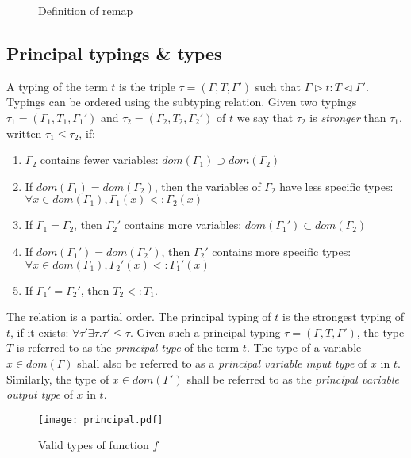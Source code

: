 \documentclass[preprint]{sigplanconf}
\newcommand{\typerule}[4]{#1 \triangleright #2 : #3 \triangleleft #4}
\begin{document}
\begin{figure}
\ottdefnremap

\caption{\label{fig:remaprules} Definition of remap}
\end{figure}

\subsection{Principal typings \& types}

A typing of the term $t$ is the triple $\tau = (\Gamma,T,\Gamma')$ such that
$\typerule{\Gamma}{t}{T}{\Gamma'}$. Typings can be ordered using the subtyping
relation. Given two typings $\tau_1 = (\Gamma_1,T_1,\Gamma_1')$ and
$\tau_2 = (\Gamma_2,T_2,\Gamma_2')$ of $t$ we say that $\tau_2$ is 
{\it stronger} than $\tau_1$, written $\tau_1 \leq \tau_2$, if:

\begin{enumerate}
\item $\Gamma_2$ contains fewer variables: 
      $dom(\Gamma_1) \supset dom(\Gamma_2)$
\item If $dom(\Gamma_1) = dom(\Gamma_2)$, 
	  then the variables of $\Gamma_2$ have less specific types: \\
      $\forall x \in dom(\Gamma_1), \Gamma_1(x) <: \Gamma_2(x)$
\item If $\Gamma_1 = \Gamma_2$, then $\Gamma_2'$ contains more variables:
      $dom(\Gamma_1') \subset dom(\Gamma_2)$
\item If $dom(\Gamma_1') = dom(\Gamma_2')$, then $\Gamma_2'$ contains
      more specific types: \\
      $\forall x \in dom(\Gamma_1), \Gamma_2'(x) <: \Gamma_1'(x)$
\item If $\Gamma_1' = \Gamma_2'$, then $T_2 <: T_1$.
\end{enumerate}

The relation is a partial order. The principal typing of $t$ is the strongest 
typing of $t$, if it exists: $\forall \tau' \exists \tau . \tau' \leq \tau$.
Given such a principal typing
$\tau = (\Gamma,T,\Gamma')$, the type $T$ 
is referred to as the {\it principal type} of the term $t$.
The type of a variable $x \in dom(\Gamma)$ shall also be referred to as a 
{\it principal variable input type} of $x$ in $t$. Similarly, the type
of $x \in dom(\Gamma')$ shall be referred to as the
{\it principal variable output type} of $x$ in $t$.

\begin{figure}
\texttt{[image: principal.pdf]}
\caption{\label{fig:principalex} Valid types of function $f$}
\end{figure}
\end{document}

